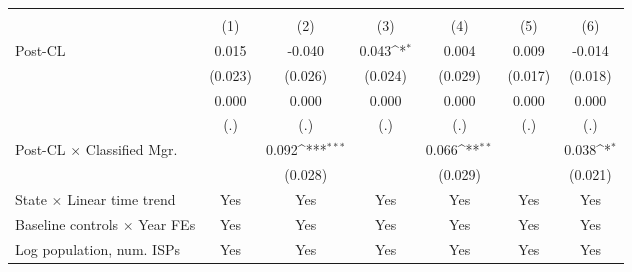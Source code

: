 {
\def\sym#1{\ifmmode^{#1}\else\(^{#1}\)\fi}
\begin{tabular}{l*{6}{c}}
\toprule
                    &&&\\\cmidrule(lr){2-3}\cmidrule(lr){4-5}\cmidrule(lr){6-7}
                    &         &         &         &         &         &         \\
\midrule
Post-CL             &       0.015         &      -0.040         &       0.043\sym{*}  &       0.004         &       0.009         &      -0.014         \\
                    &     (0.023)         &     (0.026)         &     (0.024)         &     (0.029)         &     (0.017)         &     (0.018)         \\
                   &       0.000         &       0.000         &       0.000         &       0.000         &       0.000         &       0.000         \\
                    &         (.)         &         (.)         &         (.)         &         (.)         &         (.)         &         (.)         \\
\addlinespace
Post-CL $\times$ Classified Mgr.&                     &       0.092\sym{***}&                     &       0.066\sym{**} &                     &       0.038\sym{*}  \\
                    &                     &     (0.028)         &                     &     (0.029)         &                     &     (0.021)         \\
\addlinespace
State $\times$ Linear time trend &         Yes         &         Yes         &         Yes         &         Yes         &         Yes         &         Yes         \\
\addlinespace
Baseline controls $\times$ Year FEs &         Yes         &         Yes         &         Yes         &         Yes         &         Yes         &         Yes         \\
\addlinespace
Log population, num. ISPs &         Yes         &         Yes         &         Yes         &         Yes         &         Yes         &         Yes         \\

\end{tabular}}
